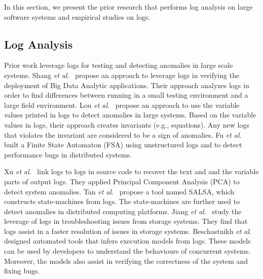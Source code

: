 
In this section, we present the prior research that performs log analysis on large software systems and empirical studies on logs. 


\subsection{Log Analysis}

Prior work leverage logs for testing and detecting anomalies in large scale systems. Shang\textsl{ et al$.$}~\cite{IanContextinformation} propose an approach to leverage logs in verifying the deployment of Big Data Analytic applications. Their approach analyzes logs in order to find differences between running in a small testing environment and a large field environment. Lou \textsl{et al}$.$~\cite{JGLouMining} propose an approach to use the variable values printed in logs to detect anomalies in large systems. Based on the variable values in logs, their approach creates invariants (e.g., equations). Any new logs that violates the invariant are considered to be a sign of anomalies. Fu \textsl{et al}$ . $~\cite{QFuanomaly} built a Finite State Automaton (FSA) using unstructured logs and to detect performance bugs in distributed systems. 

\indent Xu \textsl{et al}$ . $~\cite{ConsoleLogs} link logs to logs in source code to recover the text and and the variable parts of output logs. They applied Principal Component Analysis (PCA) to detect system anomalies. Tan \textsl{et al}$ . $~\cite{TanSalsa} propose a tool named SALSA, which constructs state-machines from logs. The state-machines are further used to detect anomalies in distributed computing platforms. Jiang \textsl{et al}$ . $~\cite{Jiang:2009:UCP:1525908.1525912} study the leverage of logs in troubleshooting issues from storage systems. They find that logs assist in a faster resolution of issues in storage systems. Beschastnikh \textsl{et al}$ . $~\cite{Beschastnikh:2011:LEI:2025113.2025151} designed automated tools that infers execution models from logs. These models can be used by developers to understand the behaviours of concurrent systems. Moreover, the models also assist in verifying the correctness of the system and fixing bugs.

